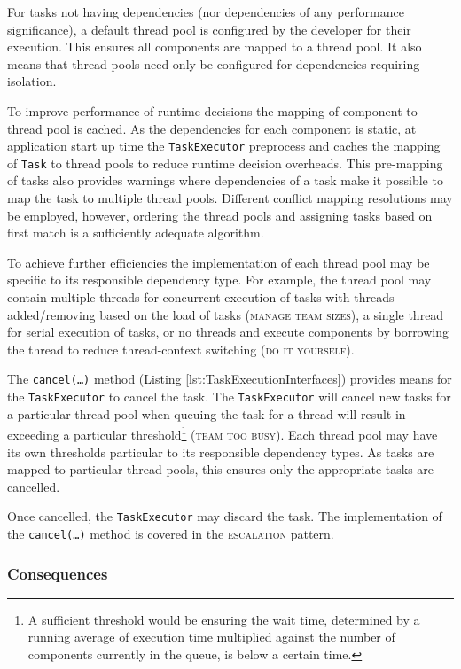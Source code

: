 \documentclass[prodmode]{style/acmlarge}
\begin{document}
For tasks not having dependencies (nor dependencies of any performance
significance), a default thread pool is configured by the developer for their
execution.  This ensures all components are mapped to a thread pool.  It also
means that thread pools need only be configured for dependencies requiring
isolation.

To improve performance of runtime decisions the mapping of component to thread
pool is cached.  As the dependencies for each component is static, at
application start up time the \texttt{TaskExecutor} preprocess and caches the
mapping of \texttt{Task} to thread pools to reduce runtime decision overheads. 
This pre-mapping of tasks also provides warnings where dependencies of a task
make it possible to map the task to multiple thread pools.  Different conflict
mapping resolutions may be employed, however, ordering the thread pools and
assigning tasks based on first match is a sufficiently adequate algorithm.

To achieve further efficiencies the implementation of each thread pool may be
specific to its responsible dependency type.  For example, the thread pool may
contain multiple threads for concurrent execution of tasks with threads
added/removing based on the load of tasks (\textsc{manage team sizes}), a single
thread for serial execution of tasks, or no threads and execute components by
borrowing the thread to reduce thread-context switching (\textsc{do it
yourself}).

The \texttt{cancel(\ldots)} method (Listing \ref{lst:TaskExecutionInterfaces})
provides means for the \texttt{TaskExecutor} to cancel the task.
The \texttt{Task\-Executor} will cancel new tasks for a particular thread pool
when queuing the task for a thread will result in exceeding a particular
threshold\footnote{A sufficient threshold would be ensuring the wait time,
determined by a running average of execution time multiplied against the number
of components currently in the queue, is below a certain time.} (\textsc{team
too busy}).  Each thread pool may have its own thresholds particular to its
responsible dependency types.  As tasks are mapped to particular thread pools,
this ensures only the appropriate tasks are cancelled.

Once cancelled, the \texttt{TaskExecutor} may discard the task.  The
implementation of the \texttt{can\-cel(\ldots)} method is covered in the
\textsc{escalation} pattern.


\subsubsection*{Consequences}
\end{document}
